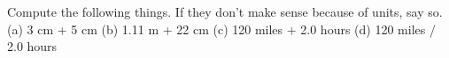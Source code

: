 Compute the following things. If they don't make sense
because of units, say so.\\
(a) 3 cm + 5 cm \hwendpart
(b) 1.11 m + 22 cm \hwendpart
(c) 120 miles + 2.0 hours \hwendpart
(d) 120 miles / 2.0 hours \hwendpart
